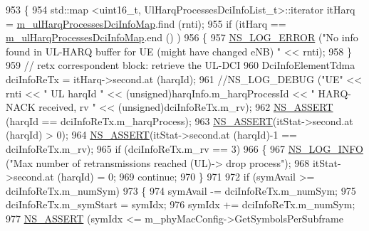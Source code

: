 \begin{DoxyCode}
953                         \{
954                                 std::map <uint16\_t, UlHarqProcessesDciInfoList\_t>::iterator itHarq = 
      \hyperlink{classns3_1_1MmWaveFlexTtiMaxRateMacScheduler_a5ae563578daa0d3ea769017d73218ec3}{m\_ulHarqProcessesDciInfoMap}.find (rnti);
955                                 \textcolor{keywordflow}{if} (itHarq == \hyperlink{classns3_1_1MmWaveFlexTtiMaxRateMacScheduler_a5ae563578daa0d3ea769017d73218ec3}{m\_ulHarqProcessesDciInfoMap}.end ()
      )
956                                 \{
957                                         \hyperlink{group__logging_ga0261a8db1d4ac5f79417d117634fd455}{NS\_LOG\_ERROR} (\textcolor{stringliteral}{"No info found in UL-HARQ buffer for UE
       (might have changed eNB) "} << rnti);
958                                 \}
959                                 \textcolor{comment}{// retx correspondent block: retrieve the UL-DCI}
960                                 DciInfoElementTdma dciInfoReTx = itHarq->second.at (harqId);
961                                 \textcolor{comment}{//NS\_LOG\_DEBUG ("UE" << rnti << " UL harqId " <<
       (unsigned)harqInfo.m\_harqProcessId << " HARQ-NACK received, rv " << (unsigned)dciInfoReTx.m\_rv);}
962                                 \hyperlink{assert_8h_a6dccdb0de9b252f60088ce281c49d052}{NS\_ASSERT} (harqId == dciInfoReTx.m\_harqProcess);
963                                 \hyperlink{assert_8h_a6dccdb0de9b252f60088ce281c49d052}{NS\_ASSERT}(itStat->second.at (harqId) > 0);
964                                 \hyperlink{assert_8h_a6dccdb0de9b252f60088ce281c49d052}{NS\_ASSERT}(itStat->second.at (harqId)-1 == dciInfoReTx.m\_rv);
965                                 \textcolor{keywordflow}{if} (dciInfoReTx.m\_rv == 3)
966                                 \{
967                                         \hyperlink{group__logging_gafbd73ee2cf9f26b319f49086d8e860fb}{NS\_LOG\_INFO} (\textcolor{stringliteral}{"Max number of retransmissions reached
       (UL)-> drop process"});
968                                         itStat->second.at (harqId) = 0;
969                                         \textcolor{keywordflow}{continue};
970                                 \}
971 
972                                 \textcolor{keywordflow}{if} (symAvail >= dciInfoReTx.m\_numSym)
973                                 \{
974                                         symAvail -= dciInfoReTx.m\_numSym;
975                                         dciInfoReTx.m\_symStart = symIdx;
976                                         symIdx += dciInfoReTx.m\_numSym;
977                                         \hyperlink{assert_8h_a6dccdb0de9b252f60088ce281c49d052}{NS\_ASSERT} (symIdx <= m\_phyMacConfig->GetSymbolsPerSubframe

\end{DoxyCode}
